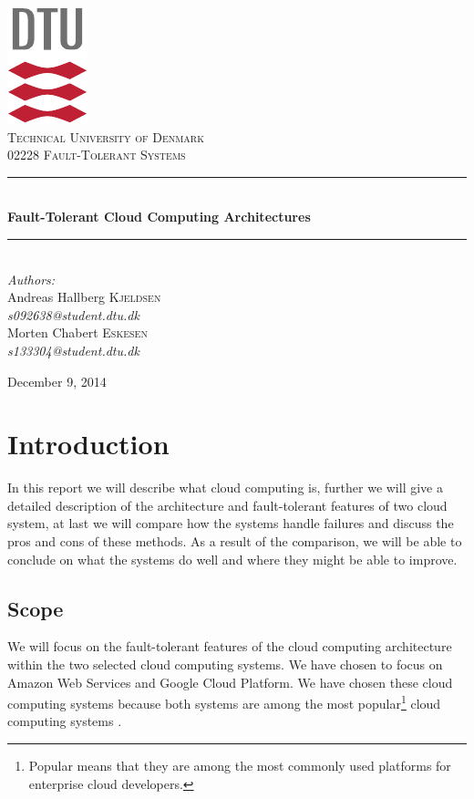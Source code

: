 \documentclass[11pt]{report}
\newcommand{\HRule}{\rule{\linewidth}{0.5mm}}
\begin{document}
\begin{titlepage}
\begin{center}

\includegraphics[scale=2.0]{../GFX/dtu_logo.pdf}\\[1cm]
\textsc{\LARGE Technical University of Denmark}\\[1.5cm]
\textsc{\Large 02228 Fault-Tolerant Systems}\\[0.5cm]

\HRule \\[0.4cm]
{\huge \bfseries Fault-Tolerant Cloud Computing Architectures}\\[0.1cm]
\HRule \\[1.5cm]

{\large
\emph{Authors:} \\[10pt]
Andreas Hallberg \textsc{Kjeldsen}\\
\emph{s092638@student.dtu.dk} \\[10pt]
Morten Chabert \textsc{Eskesen}\\
\emph{s133304@student.dtu.dk}
}
\vfill

{\large December 9, 2014}

\end{center}
\end{titlepage}

\begingroup
\tableofcontents
\let\clearpage\relax
\listoffigures
\endgroup

\chapter{Introduction}
In this report we will describe what cloud computing is, further we will give a detailed description of the architecture and fault-tolerant features of two cloud system, at last we will compare how the systems handle failures and discuss the pros and cons of these methods. As a result of the comparison, we will be able to conclude on what the systems do well and where they might be able to improve.

\section{Scope}
We will focus on the fault-tolerant features of the cloud computing architecture within the two selected cloud computing systems. We have chosen to focus on Amazon Web Services and Google Cloud Platform. We have chosen these cloud computing systems because both systems are among the most popular\footnote{Popular means that they are among the most commonly used platforms for enterprise cloud developers.} cloud computing systems \cite{cloudsurvey}.
\end{document}
